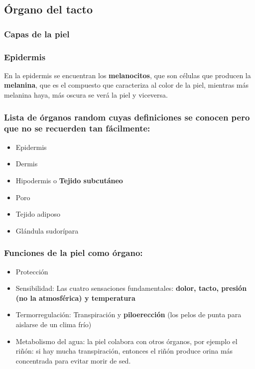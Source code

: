 \documentclass{article}
\begin{document}
\subsection{Órgano del tacto}
\subsubsection{Capas de la piel}

\subsubsection{\textbf{Epidermis}}
En la epidermis se encuentran los \textbf{melanocitos},
que son células que producen la \textbf{melanina},
que es el compuesto que caracteriza al color de la piel,
mientras más melanina haya, más oscura se verá la piel y viceversa.

\subsubsection{Lista de órganos random cuyas definiciones se conocen
pero que no se recuerden tan fácilmente:}
\begin{itemize}
  \item Epidermis
  \item Dermis
  \item Hipodermis o \textbf{Tejido subcutáneo}
  \item Poro
  \item Tejido adiposo
  \item Glándula sudorípara
\end{itemize}

\subsubsection{Funciones de la piel como órgano:}
\begin{itemize}
  \item Protección
  \item Sensibilidad: Las cuatro sensaciones fundamentales: \textbf{dolor, tacto,
    presión (no la atmosférica) y temperatura}
  \item Termorregulación: Transpiración y \textbf{piloerección}
    (los pelos de punta para aislarse de un clima frío)
  \item Metabolismo del agua: la piel colabora con otros 
    órganos, por ejemplo el riñón: si hay mucha
    transpiración, entonces el riñón produce orina más 
    concentrada para evitar morir de sed.
\end{itemize}
\end{document}
